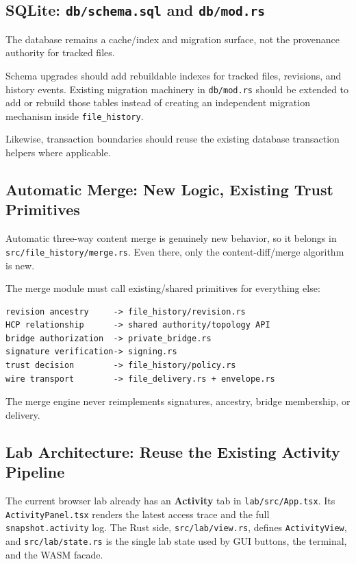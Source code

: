 \documentclass[11pt]{article}
\begin{document}
\subsection{SQLite: \texttt{db/schema.sql} and \texttt{db/mod.rs}}

The database remains a cache/index and migration surface, not the provenance authority for tracked files.

Schema upgrades should add rebuildable indexes for tracked files, revisions, and history events. Existing migration machinery in \texttt{db/mod.rs} should be extended to add or rebuild those tables instead of creating an independent migration mechanism inside \texttt{file\_history}.

Likewise, transaction boundaries should reuse the existing database transaction helpers where applicable.

\subsection{Automatic Merge: New Logic, Existing Trust Primitives}

Automatic three-way content merge is genuinely new behavior, so it belongs in \texttt{src/file\_history/merge.rs}. Even there, only the content-diff/merge algorithm is new.

The merge module must call existing/shared primitives for everything else:

\begin{lstlisting}
revision ancestry     -> file_history/revision.rs
HCP relationship      -> shared authority/topology API
bridge authorization  -> private_bridge.rs
signature verification-> signing.rs
trust decision        -> file_history/policy.rs
wire transport        -> file_delivery.rs + envelope.rs
\end{lstlisting}

The merge engine never reimplements signatures, ancestry, bridge membership, or delivery.

\subsection{Lab Architecture: Reuse the Existing Activity Pipeline}

The current browser lab already has an \textbf{Activity} tab in \texttt{lab/src/App.tsx}. Its \texttt{ActivityPanel.tsx} renders the latest access trace and the full \texttt{snapshot.activity} log. The Rust side, \texttt{src/lab/view.rs}, defines \texttt{ActivityView}, and \texttt{src/lab/state.rs} is the single lab state used by GUI buttons, the terminal, and the WASM facade.
\end{document}
